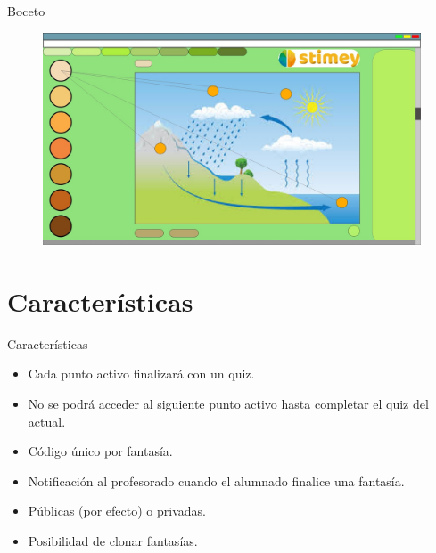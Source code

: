 \documentclass{beamer}
\begin{document}
\begin{frame}{Boceto}
	\begin{figure}
		\centering
		\includegraphics[scale=0.21]{Boceto.jpeg}
	\end{figure}
\end{frame}

\section{Características}
\begin{frame}{Características}
\begin{itemize}
	\item Cada punto activo finalizará con un quiz.
	\item No se podrá acceder al siguiente punto activo hasta completar el quiz del actual.
	\item Código único por fantasía.
	\item Notificación al profesorado cuando el alumnado finalice una fantasía.
	\item Públicas (por efecto) o privadas.
	\item Posibilidad de clonar fantasías.
\end{itemize}
\end{frame}
\end{document}
